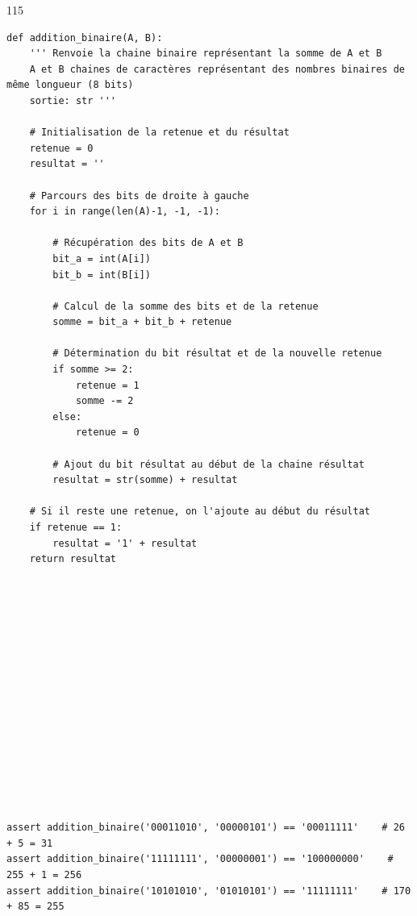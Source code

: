 \documentclass[a4paper,10pt]{report}
\begin{document}
\begin{answer}{1}{15} 
\begin{verbatim}
def addition_binaire(A, B):
    ''' Renvoie la chaine binaire représentant la somme de A et B
    A et B chaines de caractères représentant des nombres binaires de même longueur (8 bits)
    sortie: str '''

    # Initialisation de la retenue et du résultat
    retenue = 0
    resultat = ''

    # Parcours des bits de droite à gauche
    for i in range(len(A)-1, -1, -1):

        # Récupération des bits de A et B
        bit_a = int(A[i])
        bit_b = int(B[i])

        # Calcul de la somme des bits et de la retenue
        somme = bit_a + bit_b + retenue

        # Détermination du bit résultat et de la nouvelle retenue
        if somme >= 2:
            retenue = 1
            somme -= 2
        else:
            retenue = 0

        # Ajout du bit résultat au début de la chaine résultat
        resultat = str(somme) + resultat

    # Si il reste une retenue, on l'ajoute au début du résultat
    if retenue == 1:
        resultat = '1' + resultat
    return resultat
















assert addition_binaire('00011010', '00000101') == '00011111'    # 26 + 5 = 31
assert addition_binaire('11111111', '00000001') == '100000000'    # 255 + 1 = 256
assert addition_binaire('10101010', '01010101') == '11111111'    # 170 + 85 = 255
    \end{verbatim}

    \end{answer}
\end{document}
